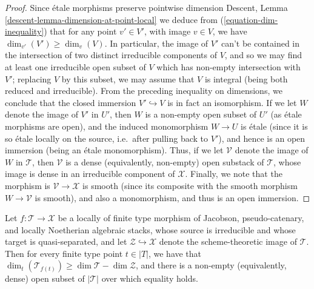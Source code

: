 \begin{proof}
\medskip\noindent
Since \'etale morphisms preserve pointwise dimension
Descent, Lemma \ref{descent-lemma-dimension-at-point-local}
we deduce from (\ref{equation-dim-inequality})
that for any point $v' \in V'$,
with image $v \in V$, we have
$\dim_{v'}( V') \geq \dim_v(V)$.
In particular, the image of $V'$ can't be contained in the intersection
of two distinct irreducible components of $V$, and so we may find
at least one irreducible open subset of $V$ which has non-empty intersection
with $V'$; replacing $V$ by this subset, we may assume that $V$ is integral
(being both reduced and irreducible).  From the preceding inequality
on dimensions, we conclude that the closed immersion $V' \hookrightarrow V$
is in fact an isomorphism.
If we let $W$ denote the image of $V'$
in $U'$, then $W$ is a non-empty
open subset of $U'$ (as \'etale morphisms are open),
and the induced monomorphism $W \to U$ is \'etale
(since it is so \'etale locally on the source, i.e.\ after pulling back
to $V'$), and hence is an open immersion (being an \'etale monomorphism).
Thus, if we let $\mathcal{V}$ denote the image of $W$ in $\mathcal{T}$,
then $\mathcal{V}$ is a dense (equivalently, non-empty) open substack of
$\mathcal{T}$,
whose image is dense in an irreducible component of $\mathcal{X}$.
Finally,
we note that the morphism is $\mathcal{V} \to \mathcal{X}$ is smooth
(since its composite
with the smooth morphism $W\to \mathcal{V}$ is smooth),
and also a monomorphism, and thus is an open immersion.
\end{proof}

\begin{lemma}
\label{lemma-dims-of-images}
Let $f: \mathcal{T} \to \mathcal{X}$ be a locally of finite type
morphism of Jacobson, pseudo-catenary, and locally Noetherian
algebraic stacks,
whose source is irreducible and whose target is quasi-separated,
and let $\mathcal{Z} \hookrightarrow \mathcal{X}$ denote the scheme-theoretic
image of $\mathcal{T}$.
Then for every finite type point $t \in |T|$,
we have that
$\dim_t( \mathcal{T}_{f(t)}) \geq \dim \mathcal{T}  - \dim \mathcal{Z}$,
and there is a non-empty (equivalently, dense)
open subset of $|\mathcal{T}|$ over which equality holds.
\end{lemma}

